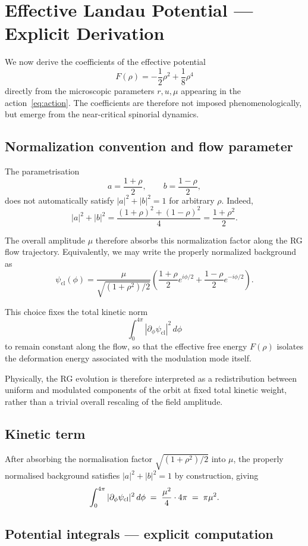 \documentclass[12pt,a4paper]{article}
\theoremstyle{definition}
\begin{document}
\section{Effective Landau Potential — Explicit Derivation}
\label{sec:landau}
We now derive the coefficients of the effective potential
\[
F(\rho)= -\frac12\rho^2+\frac18\rho^4
\]
directly from the microscopic parameters $r,u,\mu$
appearing in the action~\eqref{eq:action}.
The coefficients are therefore not imposed phenomenologically,
but emerge from the near-critical spinorial dynamics.
\subsection{Normalization convention and flow parameter}

The parametrisation
\[
a=\frac{1+\rho}{2},
\qquad
b=\frac{1-\rho}{2},
\]
does not automatically satisfy
$|a|^2+|b|^2=1$ for arbitrary $\rho$.
Indeed,
\[
|a|^2+|b|^2
=
\frac{(1+\rho)^2+(1-\rho)^2}{4}
=
\frac{1+\rho^2}{2}.
\]

The overall amplitude $\mu$ therefore absorbs this normalization factor along
the RG flow trajectory.
Equivalently, we may write the properly normalized background as
\[
\psi_{\mathrm{cl}}(\phi)
=
\frac{\mu}{\sqrt{(1+\rho^2)/2}}
\left(
\frac{1+\rho}{2}e^{i\phi/2}
+
\frac{1-\rho}{2}e^{-i\phi/2}
\right).
\]

This choice fixes the total kinetic norm
\[
\int_0^{4\pi}|\partial_\phi\psi_{\mathrm{cl}}|^2\,d\phi
\]
to remain constant along the flow, so that the effective free energy
$F(\rho)$ isolates the deformation energy associated with the modulation mode itself.

Physically, the RG evolution is therefore interpreted as a redistribution
between uniform and modulated components of the orbit at fixed total kinetic weight,
rather than a trivial overall rescaling of the field amplitude.
\subsection{Kinetic term}

After absorbing the normalisation factor $\sqrt{(1+\rho^2)/2}$
into $\mu$, the properly normalised background satisfies
$|a|^2 + |b|^2 = 1$ by construction, giving
\[
\int_0^{4\pi}|\partial_\phi\psi_{\rm cl}|^2\,d\phi
\;=\; \frac{\mu^2}{4} \cdot 4\pi \;=\; \pi\mu^2.
\]
\subsection{Potential integrals — explicit computation}
\end{document}
